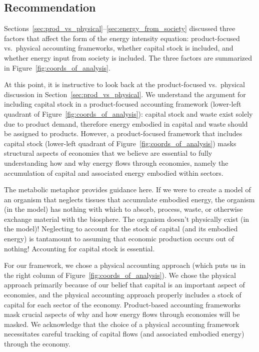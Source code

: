 \subsection{Recommendation}
\label{sec:I-O_recommendation}

Sections~\ref{sec:prod_vs_physical}--\ref{sec:energy_from_society} 
discussed three factors that affect the form of the
energy intensity equation: 
product-focused vs.\ physical accounting frameworks,
whether capital stock is included, and
whether energy input from society is included.
The three factors are summarized in Figure~\ref{fig:coords_of_analysis}.

At this point, it is instructive to look back at the 
product-focused vs.\ physical discussion in Section~\ref{sec:prod_vs_physical}.
We understand the argument for including capital stock in a product-focused
accounting framework (lower-left quadrant of Figure~\ref{fig:coords_of_analysis}):
capital stock and waste exist 
solely due to product demand, 
therefore energy embodied in capital and waste should be assigned to products. 
However, a product-focused framework that includes capital stock (lower-left quadrant of
Figure~\ref{fig:coords_of_analysis})
masks structural aspects of economies
that we believe are essential to fully understanding how and why energy flows 
through economies, namely the accumulation of capital
and associated energy embodied within sectors.

The metabolic metaphor provides guidance here. 
If we were to create a model of an organism that neglects 
tissues that accumulate embodied energy,
the organism (in the model) has nothing with which to 
absorb, process, waste, or otherwise exchange
material with the biosphere.
The organism doesn't physically exist (in the model)!
Neglecting to account for the stock of capital (and its embodied energy) 
is tantamount to assuming that economic production occurs out of nothing!
Accounting for capital stock is essential.

For our framework, we chose a physical accounting approach
(which puts us in the right column of Figure~\ref{fig:coords_of_analysis}).
We chose the physical approach primarily because of our belief that 
capital is an important aspect of economies,
and the physical accounting approach
properly includes a stock of capital for each sector of the economy.
Product-based accounting frameworks mask crucial aspects 
of why and how energy flows through economies will be masked.
We acknowledge that the choice of a physical accounting framework necessitates
careful tracking of capital flows (and associated embodied energy)
through the economy. 

